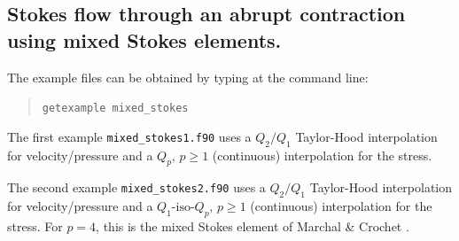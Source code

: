 \subsection{Stokes flow through an abrupt contraction using mixed Stokes
 elements.}
\label{sec:mixedcontraction}

The example files can be obtained by typing at the command line:
\begin{quote}
  \texttt{getexample mixed\_stokes}
\end{quote}

The first example \texttt{mixed\_stokes1.f90} uses a $Q_2/Q_1$ Taylor-Hood
interpolation for velocity/pressure and a $Q_p,\, p\geq 1$ (continuous) interpolation for the stress.

The second example \texttt{mixed\_stokes2.f90} uses a $Q_2/Q_1$ Taylor-Hood
interpolation for velocity/pressure and a $Q_1\text{-iso-}Q_p,\, p\geq 1$ (continuous) interpolation for the stress. For $p=4$, this is the mixed Stokes element of Marchal \& Crochet \cite{marchal_new_1987}.

